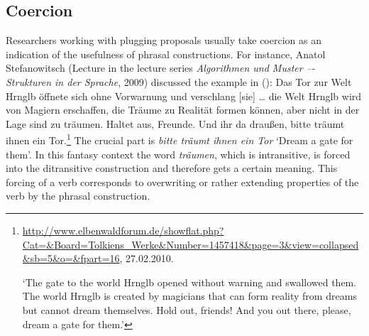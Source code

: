 \addlines
\subsection{Coercion}
\label{coercion-sec}

Researchers working with plugging proposals usually take coercion as an indication of the usefulness of phrasal
constructions. For instance, Anatol Stefanowitsch (Lecture in the lecture series \emph{Algorithmen und Muster –-
  Strukturen in der Sprache}, 2009) discussed the example in ():
\ea
Das Tor zur Welt Hrnglb öffnete sich ohne Vorwarnung
und verschlang [sie] \ldots{} die Welt Hrnglb wird von Magiern
erschaffen, die Träume zu Realität formen können, aber
nicht in der Lage sind zu träumen. Haltet aus, Freunde.
Und ihr da draußen, bitte träumt ihnen ein Tor.\footnote{
\url{http://www.elbenwaldforum.de/showflat.php?Cat=&Board=Tolkiens_Werke&Number=1457418&page=3&view=collapsed&sb=5&o=&fpart=16}, 27.02.2010.

`The gate to the world Hrnglb opened without warning and swallowed them. The world Hrnglb is created
by magicians that can form reality from dreams but cannot dream themselves. Hold out, friends! And
you out there, please, dream a gate for them.'
}
\z
The crucial part is \emph{bitte träumt ihnen ein Tor} `Dream a gate for them'. In this fantasy
context the word \emph{träumen}, which is intransitive, is forced into the ditransitive construction
and therefore gets a certain meaning. This forcing of a verb corresponds to overwriting or rather extending properties
of the verb by the phrasal construction.


